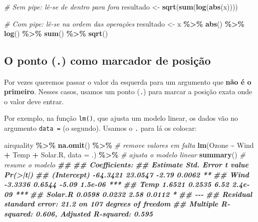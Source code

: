 \documentclass[
  portuguese,
  11pt,
  openany]{book}
\newenvironment{Shaded}{\begin{snugshade}}{\end{snugshade}}
\newcommand{\AttributeTok}[1]{\textcolor[rgb]{0.13,0.29,0.53}{#1}}
\newcommand{\CommentTok}[1]{\textcolor[rgb]{0.56,0.35,0.01}{\textit{#1}}}
\newcommand{\DocumentationTok}[1]{\textcolor[rgb]{0.56,0.35,0.01}{\textbf{\textit{#1}}}}
\newcommand{\FunctionTok}[1]{\textcolor[rgb]{0.13,0.29,0.53}{\textbf{#1}}}
\newcommand{\NormalTok}[1]{#1}
\newcommand{\OtherTok}[1]{\textcolor[rgb]{0.56,0.35,0.01}{#1}}
\newcommand{\SpecialCharTok}[1]{\textcolor[rgb]{0.81,0.36,0.00}{\textbf{#1}}}
\begin{document}
\begin{Shaded}
\begin{Highlighting}[]
\CommentTok{\# Sem pipe: lê{-}se de dentro para fora}
\NormalTok{resultado }\OtherTok{\textless{}{-}} \FunctionTok{sqrt}\NormalTok{(}\FunctionTok{sum}\NormalTok{(}\FunctionTok{log}\NormalTok{(}\FunctionTok{abs}\NormalTok{(x))))}

\CommentTok{\# Com pipe: lê{-}se na ordem das operações}
\NormalTok{resultado }\OtherTok{\textless{}{-}}\NormalTok{ x }\SpecialCharTok{\%\textgreater{}\%}
  \FunctionTok{abs}\NormalTok{() }\SpecialCharTok{\%\textgreater{}\%}
  \FunctionTok{log}\NormalTok{() }\SpecialCharTok{\%\textgreater{}\%}
  \FunctionTok{sum}\NormalTok{() }\SpecialCharTok{\%\textgreater{}\%}
  \FunctionTok{sqrt}\NormalTok{()}
\end{Highlighting}
\end{Shaded}

\subsection{\texorpdfstring{O ponto (\texttt{.}) como marcador de posição}{O ponto (.) como marcador de posição}}\label{o-ponto-.-como-marcador-de-posiuxe7uxe3o}

Por vezes queremos passar o valor da esquerda para um argumento que \textbf{não é o
primeiro}. Nesses casos, usamos um ponto (\texttt{.}) para marcar a posição exata onde o
valor deve entrar.

Por exemplo, na função \texttt{lm()}, que ajusta um modelo linear, os dados vão no argumento
\texttt{data\ =} (o segundo). Usamos o \texttt{.} para lá os colocar:

\begin{Shaded}
\begin{Highlighting}[]
\NormalTok{airquality }\SpecialCharTok{\%\textgreater{}\%}
  \FunctionTok{na.omit}\NormalTok{() }\SpecialCharTok{\%\textgreater{}\%}                                     \CommentTok{\# remove valores em falta}
  \FunctionTok{lm}\NormalTok{(Ozone }\SpecialCharTok{\textasciitilde{}}\NormalTok{ Wind }\SpecialCharTok{+}\NormalTok{ Temp }\SpecialCharTok{+}\NormalTok{ Solar.R, }\AttributeTok{data =}\NormalTok{ .) }\SpecialCharTok{\%\textgreater{}\%}   \CommentTok{\# ajusta o modelo linear}
  \FunctionTok{summary}\NormalTok{()                                         }\CommentTok{\# resume o modelo}
\DocumentationTok{\#\# }
\DocumentationTok{\#\# Coefficients:}
\DocumentationTok{\#\#             Estimate Std. Error t value Pr(\textgreater{}|t|)    }
\DocumentationTok{\#\# (Intercept) {-}64.3421    23.0547   {-}2.79   0.0062 ** }
\DocumentationTok{\#\# Wind         {-}3.3336     0.6544   {-}5.09  1.5e{-}06 ***}
\DocumentationTok{\#\# Temp          1.6521     0.2535    6.52  2.4e{-}09 ***}
\DocumentationTok{\#\# Solar.R       0.0598     0.0232    2.58   0.0112 *  }
\DocumentationTok{\#\# {-}{-}{-}}
\DocumentationTok{\#\# Residual standard error: 21.2 on 107 degrees of freedom}
\DocumentationTok{\#\# Multiple R{-}squared:  0.606,  Adjusted R{-}squared:  0.595}
\end{Highlighting}
\end{Shaded}
\end{document}
